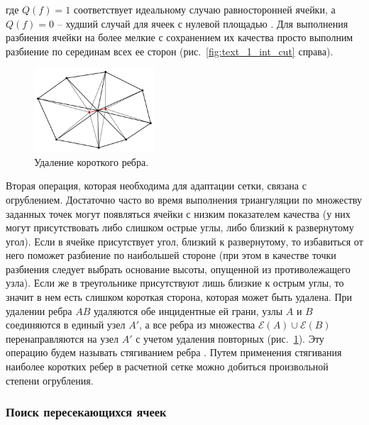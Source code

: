где $Q(f) = 1$ соответствует идеальному случаю равносторонней ячейки, а $Q(f) = 0$ -- худший случай для ячеек с нулевой площадью \cite{Borouchaki2000Remesh}.
Для выполнения разбиения ячейки на более мелкие с сохранением их качества просто выполним разбиение по серединам всех ее сторон (рис.~\ref{fig:text_1_int_cut} справа).

\begin{figure}[ht]
\centering
\includegraphics[width=0.4\textwidth]{pics/text_1_int/pic_reduce_edge.pdf}
\singlespacing
{}\caption{Удаление короткого ребра.}\label{fig:text_1_int_reduce_edge}
\end{figure}

Вторая операция, которая необходима для адаптации сетки, связана с огрублением.
Достаточно часто во время выполнения триангуляции по множеству заданных точек могут появляться ячейки с низким показателем качества (у них могут присутствовать либо слишком острые углы, либо близкий к развернутому угол).
Если в ячейке присутствует угол, близкий к развернутому, то избавиться от него поможет разбиение по наибольшей стороне (при этом в качестве точки разбиения следует выбрать основание высоты, опущенной из противолежащего узла).
Если же в треугольнике присутствуют лишь близкие к острым углы, то значит в нем есть слишком короткая сторона, которая может быть удалена.
При удалении ребра $AB$ удаляются обе инцидентные ей грани, узлы $A$ и $B$ соединяются в единый узел $A'$, а все ребра из множества $\mathscr{E}(A) \cup \mathscr{E}(B)$ перенаправляются на узел $A'$ с учетом удаления повторных (рис.~\ref{fig:text_1_int_reduce_edge}).
Эту операцию будем называть стягиванием ребра \cite{Panchal2022Tri}.
Путем применения стягивания наиболее коротких ребер в расчетной сетке можно добиться произвольной степени огрубления.


\subsubsection{Поиск пересекающихся ячеек}

